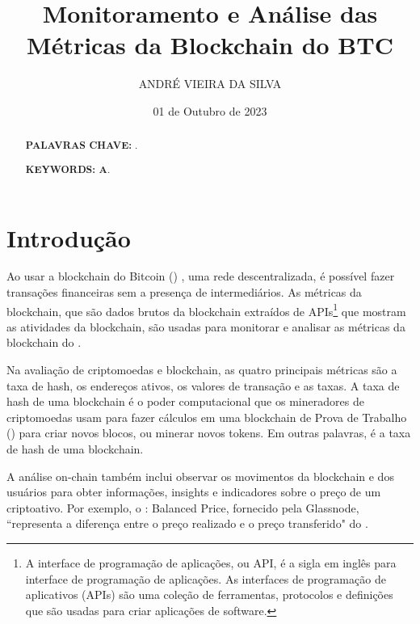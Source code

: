\documentclass[a4paper,12pt]{article}
\title{ \textbf{\large Monitoramento e Análise das Métricas da Blockchain do BTC}}
\author{ANDRÉ VIEIRA DA SILVA}
\date{01 de Outubro de 2023}
\begin{document}
\maketitle


\begin{abstract}
\textbf{PALAVRAS CHAVE: }.
\end{abstract}

\begin{abstract}

\textbf{KEYWORDS: A}.
\end{abstract}


\newpage
\tableofcontents
\newpage


\section{Introdução}
\hspace{0.5cm}Ao usar a blockchain do Bitcoin (\btc) \cite{nakamoto2008bitcoin}, uma rede descentralizada, 
é possível fazer transações financeiras sem a presença de intermediários. 
As métricas da blockchain, que são dados brutos da blockchain extraídos de 
APIs\footnote{A interface de programação de aplicações, ou API, é a sigla em inglês para interface 
de programação de aplicações. As interfaces de programação de aplicativos (APIs) são uma coleção de ferramentas, protocolos e definições que são usadas para criar aplicações de software.
} que mostram as atividades da blockchain, são usadas para monitorar e 
analisar as métricas da blockchain do \btc.

Na avaliação de criptomoedas e blockchain, as quatro principais métricas são 
a taxa de hash, os endereços ativos, os valores de transação e as taxas.
A taxa de hash de uma blockchain é o poder computacional que os mineradores 
de criptomoedas usam para fazer cálculos em uma blockchain de Prova de Trabalho (\pow)
para criar novos blocos, ou minerar novos tokens. Em outras palavras, é a taxa 
de hash de uma blockchain.

A análise on-chain também inclui observar os movimentos da blockchain e dos usuários 
para obter informações, insights e indicadores sobre o preço de um criptoativo. 
Por exemplo, o \btc: Balanced Price, fornecido pela Glassnode, ``representa a diferença 
entre o preço realizado e o preço transferido" do \btc. 
\end{document}
